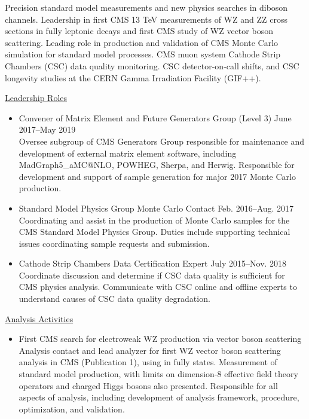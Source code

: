 \documentclass[10pt]{res} %
\begin{document}
\begin{resume}
Precision standard model measurements and new physics searches in diboson channels. Leadership in
first CMS 13 TeV measurements of WZ and ZZ cross sections in fully leptonic decays and first 
CMS study of WZ vector boson scattering.
Leading role in production and validation of CMS Monte Carlo simulation for standard model
processes. CMS muon system Cathode Strip Chambers (CSC) data quality monitoring.
CSC detector-on-call shifts, and CSC longevity studies at the
CERN Gamma Irradiation Facility (GIF++).

\underline{Leadership Roles}
\vspace{2mm}
\begin{itemize}
  \item{Convener of Matrix Element and Future Generators Group (Level 3) \hfill{June 2017--May 2019}} \\
    Oversee subgroup of CMS Generators Group
    responsible for maintenance and development of external matrix element software, 
    including MadGraph5\_aMC@NLO, POWHEG, Sherpa, and Herwig. Responsible for development and support of sample generation for
    major 2017 Monte Carlo production.
  \item{Standard Model Physics Group Monte Carlo Contact \hfill{Feb. 2016--Aug. 2017}} \\
    Coordinating and assist 
    in the production of Monte Carlo samples for the CMS Standard Model Physics Group. 
    Duties include supporting technical issues coordinating sample requests and submission.
  \item{Cathode Strip Chambers Data Certification Expert \hfill{July 2015--Nov. 2018}} \\
    Coordinate discussion and determine if
    CSC data quality is sufficient for CMS physics analysis.
    Communicate with CSC online and offline experts to understand
    causes of CSC data quality degradation.
\end{itemize}

\underline{Analysis Activities}
\vspace{2mm}
\begin{itemize}
  \item{First CMS search for electroweak WZ production via vector boson scattering}\\
    Analysis contact and lead analyzer for first WZ vector boson scattering analysis in CMS (Publication 1),
    using in fully states. 
    Measurement of standard model production, with limits on dimension-8 
    effective field theory operators and charged Higgs bosons also presented.
    Responsible for all aspects of analysis, 
    including development of analysis framework, procedure, optimization, and validation. 


\end{itemize}
\end{resume}
\end{document}
